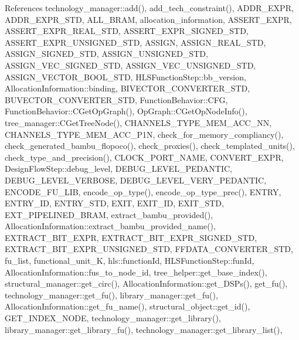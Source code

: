 References technology\+\_\+manager\+::add(), add\+\_\+tech\+\_\+constraint(), A\+D\+D\+R\+\_\+\+E\+X\+PR, A\+D\+D\+R\+\_\+\+E\+X\+P\+R\+\_\+\+S\+TD, A\+L\+L\+\_\+\+B\+R\+AM, allocation\+\_\+information, A\+S\+S\+E\+R\+T\+\_\+\+E\+X\+PR, A\+S\+S\+E\+R\+T\+\_\+\+E\+X\+P\+R\+\_\+\+R\+E\+A\+L\+\_\+\+S\+TD, A\+S\+S\+E\+R\+T\+\_\+\+E\+X\+P\+R\+\_\+\+S\+I\+G\+N\+E\+D\+\_\+\+S\+TD, A\+S\+S\+E\+R\+T\+\_\+\+E\+X\+P\+R\+\_\+\+U\+N\+S\+I\+G\+N\+E\+D\+\_\+\+S\+TD, A\+S\+S\+I\+GN, A\+S\+S\+I\+G\+N\+\_\+\+R\+E\+A\+L\+\_\+\+S\+TD, A\+S\+S\+I\+G\+N\+\_\+\+S\+I\+G\+N\+E\+D\+\_\+\+S\+TD, A\+S\+S\+I\+G\+N\+\_\+\+U\+N\+S\+I\+G\+N\+E\+D\+\_\+\+S\+TD, A\+S\+S\+I\+G\+N\+\_\+\+V\+E\+C\+\_\+\+S\+I\+G\+N\+E\+D\+\_\+\+S\+TD, A\+S\+S\+I\+G\+N\+\_\+\+V\+E\+C\+\_\+\+U\+N\+S\+I\+G\+N\+E\+D\+\_\+\+S\+TD, A\+S\+S\+I\+G\+N\+\_\+\+V\+E\+C\+T\+O\+R\+\_\+\+B\+O\+O\+L\+\_\+\+S\+TD, H\+L\+S\+Function\+Step\+::bb\+\_\+version, Allocation\+Information\+::binding, B\+I\+V\+E\+C\+T\+O\+R\+\_\+\+C\+O\+N\+V\+E\+R\+T\+E\+R\+\_\+\+S\+TD, B\+U\+V\+E\+C\+T\+O\+R\+\_\+\+C\+O\+N\+V\+E\+R\+T\+E\+R\+\_\+\+S\+TD, Function\+Behavior\+::\+C\+FG, Function\+Behavior\+::\+C\+Get\+Op\+Graph(), Op\+Graph\+::\+C\+Get\+Op\+Node\+Info(), tree\+\_\+manager\+::\+C\+Get\+Tree\+Node(), C\+H\+A\+N\+N\+E\+L\+S\+\_\+\+T\+Y\+P\+E\+\_\+\+M\+E\+M\+\_\+\+A\+C\+C\+\_\+\+NN, C\+H\+A\+N\+N\+E\+L\+S\+\_\+\+T\+Y\+P\+E\+\_\+\+M\+E\+M\+\_\+\+A\+C\+C\+\_\+\+P1N, check\+\_\+for\+\_\+memory\+\_\+compliancy(), check\+\_\+generated\+\_\+bambu\+\_\+flopoco(), check\+\_\+proxies(), check\+\_\+templated\+\_\+units(), check\+\_\+type\+\_\+and\+\_\+precision(), C\+L\+O\+C\+K\+\_\+\+P\+O\+R\+T\+\_\+\+N\+A\+ME, C\+O\+N\+V\+E\+R\+T\+\_\+\+E\+X\+PR, Design\+Flow\+Step\+::debug\+\_\+level, D\+E\+B\+U\+G\+\_\+\+L\+E\+V\+E\+L\+\_\+\+P\+E\+D\+A\+N\+T\+IC, D\+E\+B\+U\+G\+\_\+\+L\+E\+V\+E\+L\+\_\+\+V\+E\+R\+B\+O\+SE, D\+E\+B\+U\+G\+\_\+\+L\+E\+V\+E\+L\+\_\+\+V\+E\+R\+Y\+\_\+\+P\+E\+D\+A\+N\+T\+IC, E\+N\+C\+O\+D\+E\+\_\+\+F\+U\+\_\+\+L\+IB, encode\+\_\+op\+\_\+type(), encode\+\_\+op\+\_\+type\+\_\+prec(), E\+N\+T\+RY, E\+N\+T\+R\+Y\+\_\+\+ID, E\+N\+T\+R\+Y\+\_\+\+S\+TD, E\+X\+IT, E\+X\+I\+T\+\_\+\+ID, E\+X\+I\+T\+\_\+\+S\+TD, E\+X\+T\+\_\+\+P\+I\+P\+E\+L\+I\+N\+E\+D\+\_\+\+B\+R\+AM, extract\+\_\+bambu\+\_\+provided(), Allocation\+Information\+::extract\+\_\+bambu\+\_\+provided\+\_\+name(), E\+X\+T\+R\+A\+C\+T\+\_\+\+B\+I\+T\+\_\+\+E\+X\+PR, E\+X\+T\+R\+A\+C\+T\+\_\+\+B\+I\+T\+\_\+\+E\+X\+P\+R\+\_\+\+S\+I\+G\+N\+E\+D\+\_\+\+S\+TD, E\+X\+T\+R\+A\+C\+T\+\_\+\+B\+I\+T\+\_\+\+E\+X\+P\+R\+\_\+\+U\+N\+S\+I\+G\+N\+E\+D\+\_\+\+S\+TD, F\+F\+D\+A\+T\+A\+\_\+\+C\+O\+N\+V\+E\+R\+T\+E\+R\+\_\+\+S\+TD, fu\+\_\+list, functional\+\_\+unit\+\_\+K, hls\+::function\+Id, H\+L\+S\+Function\+Step\+::fun\+Id, Allocation\+Information\+::fus\+\_\+to\+\_\+node\+\_\+id, tree\+\_\+helper\+::get\+\_\+base\+\_\+index(), structural\+\_\+manager\+::get\+\_\+circ(), Allocation\+Information\+::get\+\_\+\+D\+S\+Ps(), get\+\_\+fu(), technology\+\_\+manager\+::get\+\_\+fu(), library\+\_\+manager\+::get\+\_\+fu(), Allocation\+Information\+::get\+\_\+fu\+\_\+name(), structural\+\_\+object\+::get\+\_\+id(), G\+E\+T\+\_\+\+I\+N\+D\+E\+X\+\_\+\+N\+O\+DE, technology\+\_\+manager\+::get\+\_\+library(), library\+\_\+manager\+::get\+\_\+library\+\_\+fu(), technology\+\_\+manager\+::get\+\_\+library\+\_\+list(), 